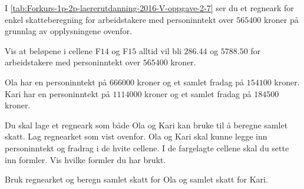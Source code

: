 I \cref{tab:Forkurs-1p-2p-laererutdanning-2016-V-oppgave-2-7} ser du et
regneark for enkel skatteberegning for arbeidstakere med personinntekt over
$\num{565400}$ kroner på grunnlag av opplysningene ovenfor.

\begin{oppgaver}
   Vis at beløpene i cellene F$14$ og F$15$ alltid vil bli
    $\num{286.44}$ og $\num{5788.50}$ for arbeidstakere med personinntekt over
    $\num{565400}$ kroner.
\end{oppgaver}

Ola har en personinntekt på $\num{666000}$ kroner og et samlet fradag på
$\num{154100}$ kroner. Kari har en personinntekt på $\num{1114000}$ kroner og
et samlet fradag på $\num{184500}$ kroner.

\begin{oppgaver}
   Du skal lage et regneark som både Ola og Kari kan bruke til å
    beregne samlet skatt. Lag regnearket som vist ovenfor. Ola og Kari skal
    kunne legge inn personinntekt og fradrag i de hvite cellene. I de fargelagte
    cellene skal du sette inn formler. Vis hvilke formler du har brukt.
\end{oppgaver}

\begin{oppgaver}
   Bruk regnearket og beregn samlet skatt for Ola og samlet skatt for
    Kari.
\end{oppgaver}


\Oppgave[7]

\begin{figure}[H]
  \centering
  \begin{subfigure}[b]{0.25\textwidth}
    \centering
    \caption{}
    \label{fig:Forkurs-1p-2p-laererutdanning-2016-V-oppgave-2-8a}
  \end{subfigure}\hfill%
  \begin{subfigure}[b]{0.32\textwidth}
    \centering
    \vspace*{-0.5cm}
    \caption{}
    \label{fig:Forkurs-1p-2p-laererutdanning-2016-V-oppgave-2-8b}
  \end{subfigure}\hfill%
  \begin{subfigure}[b]{0.41\textwidth}
    \centering
    \caption{}
    \label{fig:Forkurs-1p-2p-laererutdanning-2016-V-oppgave-2-8c}
  \end{subfigure}
  \caption{}\label{fig:Forkurs-1p-2p-laererutdanning-2016-V-oppgave-2-8}
\end{figure}

